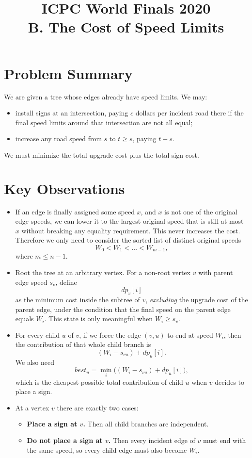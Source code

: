 \documentclass[11pt]{article}
\title{ICPC World Finals 2020\\B. The Cost of Speed Limits}
\author{}
\date{}
\begin{document}
\maketitle

\section*{Problem Summary}

We are given a tree whose edges already have speed limits.
We may:
\begin{itemize}[leftmargin=*]
    \item install signs at an intersection, paying $c$ dollars per incident road there if the final speed limits around
    that intersection are not all equal;
    \item increase any road speed from $s$ to $t \ge s$, paying $t-s$.
\end{itemize}

We must minimize the total upgrade cost plus the total sign cost.

\section*{Key Observations}

\begin{itemize}[leftmargin=*]
    \item If an edge is finally assigned some speed $x$, and $x$ is not one of the original edge speeds, we can lower it
    to the largest original speed that is still at most $x$ without breaking any equality requirement. This never
    increases the cost.
    Therefore we only need to consider the sorted list of distinct original speeds
    \[
        W_0 < W_1 < \dots < W_{m-1},
    \]
    where $m \le n-1$.
    \item Root the tree at an arbitrary vertex.
    For a non-root vertex $v$ with parent edge speed $s_v$, define
    \[
        dp_v[i]
    \]
    as the minimum cost inside the subtree of $v$, \emph{excluding} the upgrade cost of the parent edge, under the
    condition that the final speed on the parent edge equals $W_i$.
    This state is only meaningful when $W_i \ge s_v$.
    \item For every child $u$ of $v$, if we force the edge $(v,u)$ to end at speed $W_i$, then the contribution of that
    whole child branch is
    \[
        (W_i - s_{vu}) + dp_u[i].
    \]
    We also need
    \[
        best_u = \min_i \bigl((W_i - s_{vu}) + dp_u[i]\bigr),
    \]
    which is the cheapest possible total contribution of child $u$ when $v$ decides to place a sign.
    \item At a vertex $v$ there are exactly two cases:
    \begin{itemize}[leftmargin=*]
        \item \textbf{Place a sign at $v$.}
        Then all child branches are independent.
        \item \textbf{Do not place a sign at $v$.}
        Then every incident edge of $v$ must end with the same speed, so every child edge must also become $W_i$.
    \end{itemize}
\end{itemize}
\end{document}
